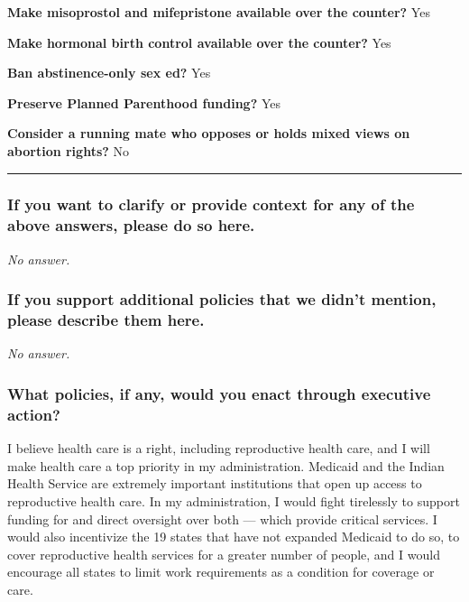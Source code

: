 \textbf{Make misoprostol and mifepristone available over the counter?}
Yes

\textbf{Make hormonal birth control available over the counter?} Yes

\textbf{Ban abstinence-only sex ed?} Yes

\textbf{Preserve Planned Parenthood funding?} Yes

\textbf{Consider a running mate who opposes or holds mixed views on
abortion rights?} No

\begin{center}\rule{0.5\linewidth}{\linethickness}\end{center}

\hypertarget{if-you-want-to-clarify-or-provide-context-for-any-of-the-above-answers-please-do-so-here-6}{%
\subsubsection{If you want to clarify or provide context for any of the
above answers, please do so
here.}\label{if-you-want-to-clarify-or-provide-context-for-any-of-the-above-answers-please-do-so-here-6}}

\emph{No answer.}

\hypertarget{if-you-support-additional-policies-that-we-didnt-mention-please-describe-them-here-6}{%
\subsubsection{If you support additional policies that we didn't
mention, please describe them
here.}\label{if-you-support-additional-policies-that-we-didnt-mention-please-describe-them-here-6}}

\emph{No answer.}

\hypertarget{what-policies-if-any-would-you-enact-through-executive-action-6}{%
\subsubsection{What policies, if any, would you enact through executive
action?}\label{what-policies-if-any-would-you-enact-through-executive-action-6}}

I believe health care is a right, including reproductive health care,
and I will make health care a top priority in my administration.
Medicaid and the Indian Health Service are extremely important
institutions that open up access to reproductive health care. In my
administration, I would fight tirelessly to support funding for and
direct oversight over both --- which provide critical services. I would
also incentivize the 19 states that have not expanded Medicaid to do so,
to cover reproductive health services for a greater number of people,
and I would encourage all states to limit work requirements as a
condition for coverage or care.

